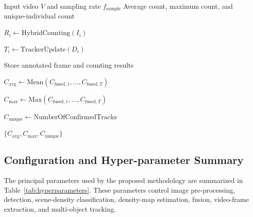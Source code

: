 \documentclass[12pt,a4paper]{report}
\begin{document}

\begin{algorithm}[htbp]
\caption{Video-Level Extension of the Proposed Counting Method}
\label{alg:video-counting}

\begin{algorithmic}[1]

\Require Input video $V$ and sampling rate $f_{\mathrm{sample}}$
\Ensure Average count, maximum count, and unique-individual count


    \State $R_i \gets \mathrm{HybridCounting}(I_i)$

    \State $T_i \gets \mathrm{TrackerUpdate}(D_i)$

    \State Store annotated frame and counting results

\EndFor

\State $C_{\mathrm{avg}}
    \gets \mathrm{Mean}(C_{\mathrm{fused},1},\ldots,
    C_{\mathrm{fused},T})$

\State $C_{\mathrm{max}}
    \gets \mathrm{Max}(C_{\mathrm{fused},1},\ldots,
    C_{\mathrm{fused},T})$

\State $C_{\mathrm{unique}}
    \gets \mathrm{NumberOfConfirmedTracks}$

\State \Return
$\{C_{\mathrm{avg}},C_{\mathrm{max}},C_{\mathrm{unique}}\}$

\end{algorithmic}
\end{algorithm}


\subsection{Configuration and Hyper-parameter Summary}

The principal parameters used by the proposed methodology are summarized
in Table~\ref{tab:hyperparameters}. These parameters control image
pre-processing, detection, scene-density classification, density-map
estimation, fusion, video-frame extraction, and multi-object tracking.
\end{document}
